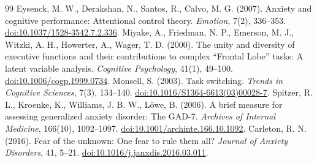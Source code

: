 \documentclass[11pt,a4paper]{article}
\begin{document}
\begin{thebibliography}{99}
 Eysenck, M. W., Derakshan, N., Santos, R., Calvo, M. G. (2007). Anxiety and cognitive performance: Attentional control theory. \textit{Emotion}, 7(2), 336--353. \href{https://doi.org/10.1037/1528-3542.7.2.336}{doi:10.1037/1528-3542.7.2.336}.
 Miyake, A., Friedman, N. P., Emerson, M. J., Witzki, A. H., Howerter, A., Wager, T. D. (2000). The unity and diversity of executive functions and their contributions to complex ``Frontal Lobe'' tasks: A latent variable analysis. \textit{Cognitive Psychology}, 41(1), 49--100. \href{https://doi.org/10.1006/cogp.1999.0734}{doi:10.1006/cogp.1999.0734}.
 Monsell, S. (2003). Task switching. \textit{Trends in Cognitive Sciences}, 7(3), 134--140. \href{https://doi.org/10.1016/S1364-6613(03)00028-7}{doi:10.1016/S1364-6613(03)00028-7}.
 Spitzer, R. L., Kroenke, K., Williams, J. B. W., Löwe, B. (2006). A brief measure for assessing generalized anxiety disorder: The GAD-7. \textit{Archives of Internal Medicine}, 166(10), 1092--1097. \href{https://doi.org/10.1001/archinte.166.10.1092}{doi:10.1001/archinte.166.10.1092}.
 Carleton, R. N. (2016). Fear of the unknown: One fear to rule them all? \textit{Journal of Anxiety Disorders}, 41, 5--21. \href{https://doi.org/10.1016/j.janxdis.2016.03.011}{doi:10.1016/j.janxdis.2016.03.011}.


\end{thebibliography}
\end{document}
